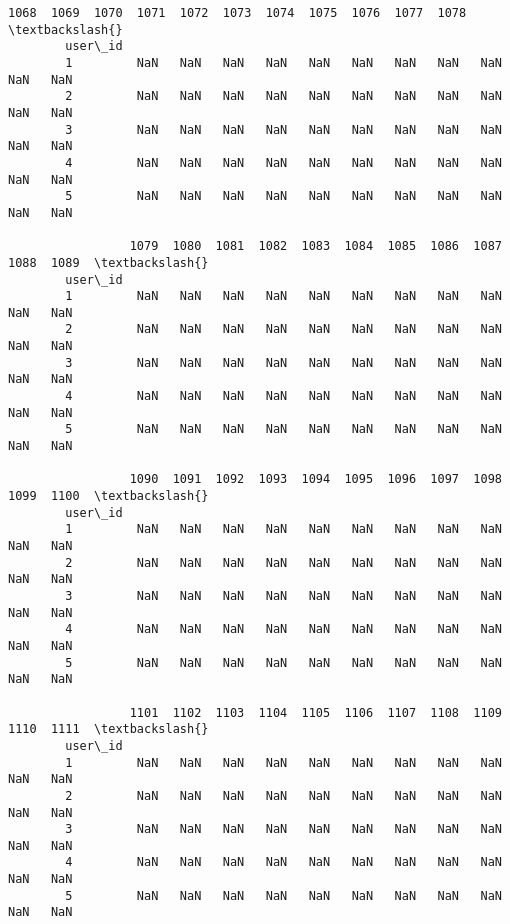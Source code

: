\documentclass[11pt]{article}
\begin{document}
\begin{Verbatim}[commandchars=\\\{\}]
                 1068  1069  1070  1071  1072  1073  1074  1075  1076  1077  1078  \textbackslash{}
        user\_id                                                                     
        1         NaN   NaN   NaN   NaN   NaN   NaN   NaN   NaN   NaN   NaN   NaN   
        2         NaN   NaN   NaN   NaN   NaN   NaN   NaN   NaN   NaN   NaN   NaN   
        3         NaN   NaN   NaN   NaN   NaN   NaN   NaN   NaN   NaN   NaN   NaN   
        4         NaN   NaN   NaN   NaN   NaN   NaN   NaN   NaN   NaN   NaN   NaN   
        5         NaN   NaN   NaN   NaN   NaN   NaN   NaN   NaN   NaN   NaN   NaN   
        
                 1079  1080  1081  1082  1083  1084  1085  1086  1087  1088  1089  \textbackslash{}
        user\_id                                                                     
        1         NaN   NaN   NaN   NaN   NaN   NaN   NaN   NaN   NaN   NaN   NaN   
        2         NaN   NaN   NaN   NaN   NaN   NaN   NaN   NaN   NaN   NaN   NaN   
        3         NaN   NaN   NaN   NaN   NaN   NaN   NaN   NaN   NaN   NaN   NaN   
        4         NaN   NaN   NaN   NaN   NaN   NaN   NaN   NaN   NaN   NaN   NaN   
        5         NaN   NaN   NaN   NaN   NaN   NaN   NaN   NaN   NaN   NaN   NaN   
        
                 1090  1091  1092  1093  1094  1095  1096  1097  1098  1099  1100  \textbackslash{}
        user\_id                                                                     
        1         NaN   NaN   NaN   NaN   NaN   NaN   NaN   NaN   NaN   NaN   NaN   
        2         NaN   NaN   NaN   NaN   NaN   NaN   NaN   NaN   NaN   NaN   NaN   
        3         NaN   NaN   NaN   NaN   NaN   NaN   NaN   NaN   NaN   NaN   NaN   
        4         NaN   NaN   NaN   NaN   NaN   NaN   NaN   NaN   NaN   NaN   NaN   
        5         NaN   NaN   NaN   NaN   NaN   NaN   NaN   NaN   NaN   NaN   NaN   
        
                 1101  1102  1103  1104  1105  1106  1107  1108  1109  1110  1111  \textbackslash{}
        user\_id                                                                     
        1         NaN   NaN   NaN   NaN   NaN   NaN   NaN   NaN   NaN   NaN   NaN   
        2         NaN   NaN   NaN   NaN   NaN   NaN   NaN   NaN   NaN   NaN   NaN   
        3         NaN   NaN   NaN   NaN   NaN   NaN   NaN   NaN   NaN   NaN   NaN   
        4         NaN   NaN   NaN   NaN   NaN   NaN   NaN   NaN   NaN   NaN   NaN   
        5         NaN   NaN   NaN   NaN   NaN   NaN   NaN   NaN   NaN   NaN   NaN   
        

\end{Verbatim}
\end{document}
